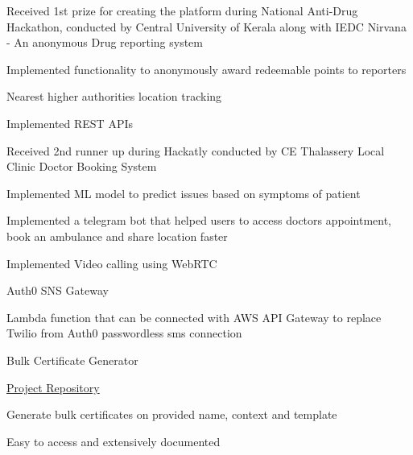 
\begin{cventries}
  \cventry
    {Received 1st prize for creating the platform during National Anti-Drug Hackathon, conducted by Central University of Kerala along with IEDC} 
    {Nirvana - An anonymous Drug reporting system}
    {}
    {} %
    {
      \begin{cvitems} %
		\item {Implemented functionality to anonymously award redeemable points to reporters}
        \item {Nearest higher authorities location tracking}
        \item {Implemented REST APIs}
      \end{cvitems}
    }

  \cventry
    {Received 2nd runner up during Hackatly conducted by CE Thalassery} %
    {Local Clinic Doctor Booking System} %
    {} %
    {} %
    {
      \begin{cvitems} %
      	\item {Implemented ML model to predict issues based on symptoms of patient}
		\item {Implemented a telegram bot that helped users to access doctors appointment, book an ambulance and share location faster}
        \item {Implemented Video calling using WebRTC}
      \end{cvitems}
    }

    \cventry
    {} %
    {Auth0 SNS Gateway} %
    {} %
    {} %
    {
      \begin{cvitems} %
      	\item {Lambda function that can be connected with AWS API Gateway to replace Twilio from Auth0 passwordless sms connection}
      \end{cvitems}
    }

    \cventry
    {} %
    {Bulk Certificate Generator} %
    {} %
    {} %
    {
      \begin{cvitems} %
      \item {\hyperlink{https://github.com/zameel7/bulk-certificate.git}{Project Repository}}
      	\item {Generate bulk certificates on provided name, context and template}
       \item {Easy to access and extensively documented}
      \end{cvitems}
    }


\end{cventries}
